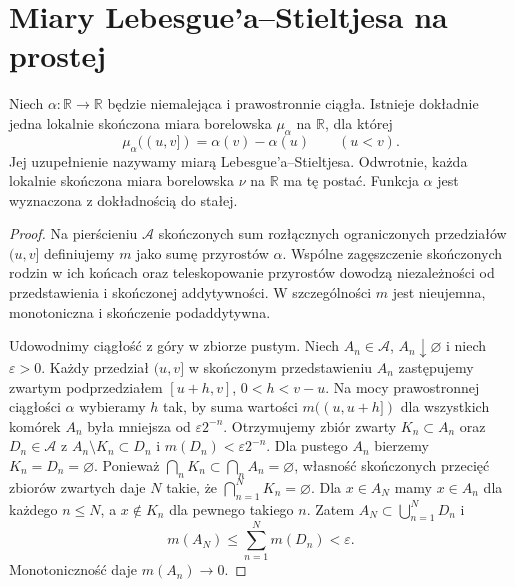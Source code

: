 \section{Miary Lebesgue'a--Stieltjesa na prostej}
\begin{twierdzenie}\label{it:thm:stieltjes-construction}
Niech $\alpha:\mathbb{R}\to\mathbb{R}$ będzie niemalejąca i prawostronnie ciągła. Istnieje dokładnie jedna lokalnie skończona miara borelowska $\mu_\alpha$ na $\mathbb{R}$, dla której
\[
 \mu_\alpha((u,v])=\alpha(v)-\alpha(u)\qquad(u<v).
\]
Jej uzupełnienie nazywamy miarą Lebesgue'a--Stieltjesa. Odwrotnie, każda lokalnie skończona miara borelowska $\nu$ na $\mathbb{R}$ ma tę postać. Funkcja $\alpha$ jest wyznaczona z dokładnością do stałej.
\end{twierdzenie}
\begin{proof}
Na pierścieniu $\mathcal A$ skończonych sum rozłącznych ograniczonych przedziałów $(u,v]$ definiujemy $m$ jako sumę przyrostów $\alpha$. Wspólne zagęszczenie skończonych rodzin w ich końcach oraz teleskopowanie przyrostów dowodzą niezależności od przedstawienia i skończonej addytywności. W szczególności $m$ jest nieujemna, monotoniczna i skończenie podaddytywna.

Udowodnimy ciągłość z góry w zbiorze pustym. Niech $A_n\in\mathcal A$, $A_n\downarrow\varnothing$ i niech $\varepsilon>0$. Każdy przedział $(u,v]$ w skończonym przedstawieniu $A_n$ zastępujemy zwartym podprzedziałem $[u+h,v]$, $0<h<v-u$. Na mocy prawostronnej ciągłości $\alpha$ wybieramy $h$ tak, by suma wartości $m((u,u+h])$ dla wszystkich komórek $A_n$ była mniejsza od $\varepsilon 2^{-n}$. Otrzymujemy zbiór zwarty $K_n\subset A_n$ oraz $D_n\in\mathcal A$ z $A_n\setminus K_n\subset D_n$ i $m(D_n)<\varepsilon 2^{-n}$. Dla pustego $A_n$ bierzemy $K_n=D_n=\varnothing$.
Ponieważ $\bigcap_n K_n\subset\bigcap_n A_n=\varnothing$, własność skończonych przecięć zbiorów zwartych daje $N$ takie, że $\bigcap_{n=1}^N K_n=\varnothing$. Dla $x\in A_N$ mamy $x\in A_n$ dla każdego $n\le N$, a $x\notin K_n$ dla pewnego takiego $n$. Zatem $A_N\subset\bigcup_{n=1}^N D_n$ i
\[
 m(A_N)\le \sum_{n=1}^Nm(D_n)<\varepsilon.
\]
Monotoniczność daje $m(A_n)\to0$.


\end{proof}
